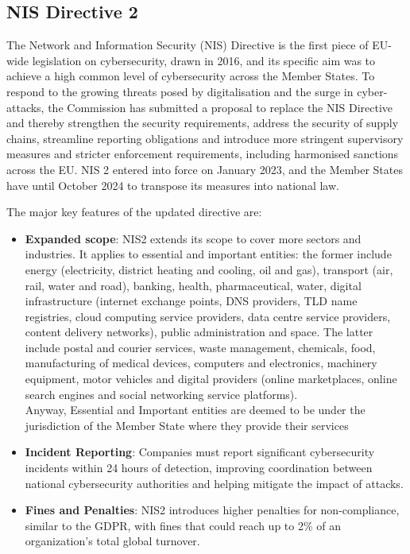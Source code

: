 \subsection{NIS Directive 2}
\label{sec:nis-directive-2}

The Network and Information Security (NIS) Directive is the first piece of EU-wide legislation on cybersecurity, drawn in 2016, and its specific aim was to achieve a high common level of cybersecurity across the Member States. To respond to the growing threats posed by digitalisation and the surge in cyber-attacks, the Commission has submitted a proposal to replace the NIS Directive and thereby strengthen the security requirements, address the security of supply chains, streamline reporting obligations and introduce more stringent supervisory measures and stricter enforcement requirements, including harmonised sanctions across the EU. NIS 2 entered into force on January 2023, and the Member States have until October 2024 to transpose its measures into national law.

The major key features of the updated directive are:~\cite{nis2-directive-faqs}
\begin{itemize}
  \item \textbf{Expanded scope}: NIS2 extends its scope to cover more sectors and industries. It applies to essential and important entities: the former include energy (electricity, district heating and cooling, oil and gas), transport (air, rail, water and road), banking, health, pharmaceutical, water, digital infrastructure (internet exchange points, DNS providers, TLD name registries, cloud computing service providers, data centre service providers, content delivery networks), public administration and space. The latter include postal and courier services, waste management, chemicals, food, manufacturing of medical devices, computers and electronics, machinery equipment, motor vehicles and digital providers (online marketplaces, online search engines and social networking service platforms).\\
        Anyway, Essential and Important entities are deemed to be under the jurisdiction of the Member State where they provide their services
  \item \textbf{Incident Reporting}: Companies must report significant cybersecurity incidents within 24 hours of detection, improving coordination between national cybersecurity authorities and helping mitigate the impact of attacks.
  \item \textbf{Fines and Penalties}: NIS2 introduces higher penalties for non-compliance, similar to the GDPR, with fines that could reach up to 2\% of an organization's total global turnover.
\end{itemize}

